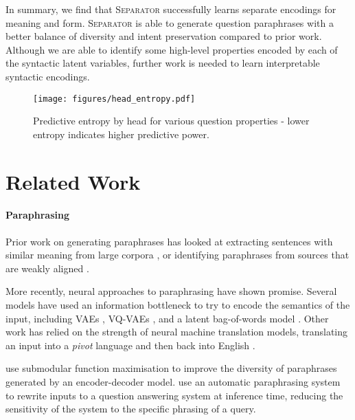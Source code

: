 \documentclass[11pt,a4paper]{article}
\begin{document}
In summary, we find that \textsc{Separator} successfully learns separate encodings for meaning and form. \textsc{Separator} is able to generate question paraphrases with a better balance of diversity and intent preservation compared to prior work. Although we are able to identify some high-level properties encoded by each of the syntactic latent variables, further work is needed to learn interpretable syntactic encodings.

\begin{figure}[t]
    \centering
    \texttt{[image: figures/head\_entropy.pdf]}
\vspace*{-.3cm}
    \caption{Predictive entropy by head for various question properties - lower entropy indicates higher predictive power. }
    \label{fig:headentropy}
\end{figure}














\section{Related Work}

\paragraph{Paraphrasing}

Prior work on generating paraphrases has looked at extracting
sentences with similar meaning from large corpora
\cite{barzilay-mckeown-2001-extracting,bannard-callison-burch-2005-paraphrasing,ganitkevitch-etal-2013-ppdb},
or identifying paraphrases from sources that are weakly aligned
\cite{dolan-etal-2004-unsupervised,coster-kauchak-2011-simple}.

More recently, neural approaches to paraphrasing have shown
promise. Several models have used an information bottleneck to try to
encode the semantics of the input, including VAEs
\cite{bowman-etal-2016-generating}, VQ-VAEs
\cite{vqvae,roy-grangier-2019-unsupervised}, and a latent bag-of-words
model \cite{latentbow}. Other work has relied on the strength of
neural machine translation models, translating an input into a
\textit{pivot} language and then back into English
\cite{mallinson-etal-2017-paraphrasing,wieting-gimpel-2018-paranmt,parabank}.

\citet{kumar-etal-2019-submodular} use submodular function maximisation to improve the diversity of paraphrases generated by an encoder-decoder model. \citet{dong-etal-2017-learning-paraphrase} use an automatic paraphrasing system to rewrite inputs to a question answering system at inference time, reducing the sensitivity of the system to the specific phrasing of a query.
\end{document}
